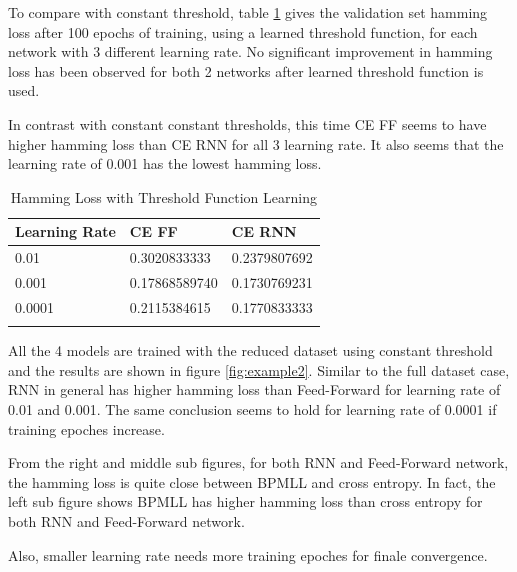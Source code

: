 \documentclass[11pt]{article}
\begin{document}
To compare with constant threshold, table \ref{PVFTD} gives the validation set hamming loss after 100 epochs of training, using a learned threshold function, for each network with 3 different learning rate. No significant improvement in hamming loss has been observed for both 2 networks after learned threshold function is used.

In contrast with constant constant thresholds, this time CE FF seems to have higher hamming loss than CE RNN for all 3 learning rate. It also seems that the learning rate of 0.001 has the lowest hamming loss.

 \begin{longtable}[c]{| p{} | p{} |p{} |}
\hline
        Learning Rate  & CE FF & CE RNN  \\
        \hline
         0.01 & 0.3020833333 & 0.2379807692 \\
        \hline
         0.001 & 0.17868589740 & 0.1730769231 \\
        \hline
         0.0001 & 0.2115384615 & 0.1770833333 \\
        \hline        
\caption{Hamming Loss with Threshold Function Learning}
\label{PVFTD}
\end{longtable}

All the 4 models are trained with the reduced dataset using constant threshold and the results are shown in figure \ref{fig:example2}. Similar to the full dataset case, RNN in general has higher hamming loss than Feed-Forward for learning rate of 0.01 and 0.001. The same conclusion seems to hold for learning rate of 0.0001 if training epoches increase. 

From the right and middle sub figures, for both RNN and Feed-Forward network, the hamming loss is quite close between BPMLL and cross entropy. In fact, the left sub figure shows BPMLL has higher hamming loss than cross entropy for both RNN and Feed-Forward network.

Also, smaller learning rate needs more training epoches for finale convergence. 
\end{document}
